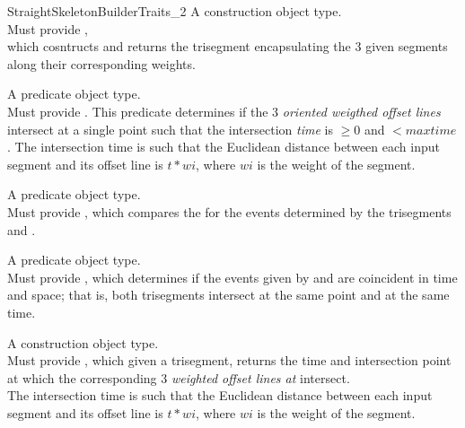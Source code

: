 \begin{ccRefConcept}{StraightSkeletonBuilderTraits_2}
{A construction object type.\\
Must provide , \\
which cosntructs and returns the trisegment encapsulating the 3 given segments along their corresponding weights.}

{A predicate object type.\\
Must provide . 
This predicate determines if the 3 \textit{oriented weigthed offset lines} intersect at a single point such that the intersection \textit{time}  is $\geq 0$ and $\lt maxtime$.
The intersection time  is such that the Euclidean distance between each input segment and its offset line is $t*wi$, where $wi$ is the weight of the segment.\\
}

{A predicate object type.\\
Must provide , which compares the  for the events determined by the trisegments  and .\\
}

{A predicate object type.\\
Must provide , which determines if the events given by  and  are coincident in time and space; that is, both trisegments intersect at the same point and at the same time.\\
}

{A construction object type.\\
Must provide , which given a trisegment, returns the time  and intersection point at which the corresponding 3 \textit{weighted offset lines at } intersect.\\
The intersection time  is such that the Euclidean distance between each input segment and its offset line is $t*wi$, where $wi$ is the weight of the segment.\\
}



\end{ccRefConcept}
